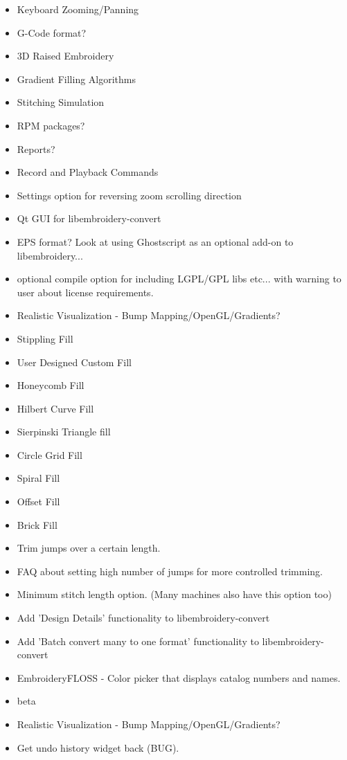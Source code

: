 \documentclass[a4paper]{report}
\begin{document}
\begin{itemize}
  \item Keyboard Zooming/Panning
  \item G-Code format?
  \item 3D Raised Embroidery
  \item Gradient Filling Algorithms
  \item Stitching Simulation
  \item RPM packages?
  \item Reports?
  \item Record and Playback Commands
  \item Settings option for reversing zoom scrolling direction
  \item Qt GUI for libembroidery-convert
  \item EPS format? Look at using Ghostscript as an optional add-on to libembroidery...
  \item optional compile option for including LGPL/GPL libs etc... with warning to user about license requirements.
  \item Realistic Visualization - Bump Mapping/OpenGL/Gradients?
  \item Stippling Fill
  \item User Designed Custom Fill
  \item Honeycomb Fill
  \item Hilbert Curve Fill
  \item Sierpinski Triangle fill
  \item Circle Grid Fill
  \item Spiral Fill
  \item Offset Fill
  \item Brick Fill
  \item Trim jumps over a certain length.
  \item FAQ about setting high number of jumps for more controlled trimming.
  \item Minimum stitch length option. (Many machines also have this option too)
  \item Add 'Design Details' functionality to libembroidery-convert
  \item Add 'Batch convert many to one format' functionality to libembroidery-convert
  \item EmbroideryFLOSS - Color picker that displays catalog numbers and names.
\item beta
  \item Realistic Visualization - Bump Mapping/OpenGL/Gradients?
  \item Get undo history widget back (BUG).

\end{itemize}
\end{document}
